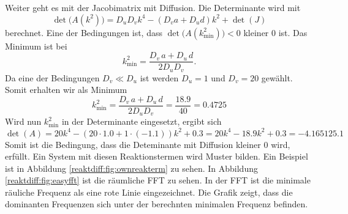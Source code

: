 Weiter geht es mit der Jacobimatrix mit Diffusion.
Die Determinante wird mit
\begin{equation*}
    \det\bigl(A(k^2)\bigr) = D_u D_v k^4 - (D_v a + D_u d) k^2 + \det(J)
\end{equation*}
berechnet.
Eine der Bedingungen ist, dass \( \det\bigl( A(k_{\min}^2)\bigr) < 0 \) kleiner 0 ist.
Das Minimum ist bei
\begin{equation*}
    k^2_{\text{min}} = \frac{D_v\, a + D_u \, d}{2 D_u D_v}.
\end{equation*}
Da eine der Bedingungen \(D_v \ll D_u\) ist werden \(D_u = 1\) und \(D_v = 20\) gewählt.
Somit erhalten wir als Minimum
\begin{equation*}
    k^2_{\text{min}} = \frac{D_v\, a + D_u\, d}{2 D_u D_v} = \frac{18.9}{40} = 0.4725
\end{equation*}
Wird nun \(k^2_{\text{min}}\) in der Determinante eingesetzt, ergibt sich
\begin{equation*}
    \det(A) = 20k^4 - (20 \cdot 1.0 + 1 \cdot (-1.1))k^2 + 0.3 = 20k^4 - 18.9k^2 + 0.3
     = -4.165125.1
\end{equation*}
Somit ist die Bedingung, dass die Deteminante mit Diffusion kleiner 0 wird, erfüllt.
Ein System mit diesen Reaktionstermen wird Muster bilden.
Ein Beispiel ist in Abbildung \ref{reaktdiff:fig:ownreakterm} zu sehen.
In Abbildung \ref{reaktdiff:fig:easyfft} ist die räumliche FFT zu sehen.
In der FFT ist die minimale räuliche Frequenz als eine rote Linie eingezeichnet.
Die Grafik zeigt, dass die dominanten Frequenzen sich unter der berechnten minimalen Frequenz befinden.

